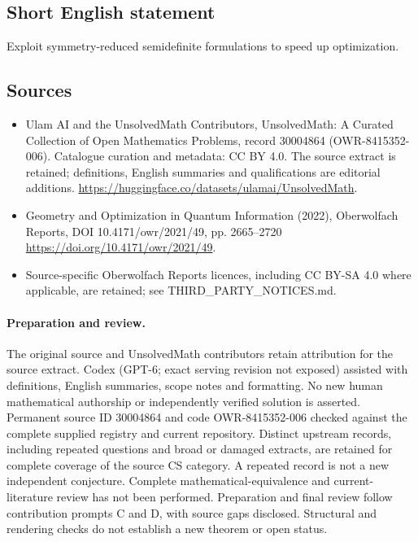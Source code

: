 \documentclass[11pt]{article}
\begin{document}
\subsection{Short English statement}
Exploit symmetry-reduced semidefinite formulations to speed up optimization.
\subsection{Sources}
\begin{itemize}
\item[\hypertarget{source:30004864:1}{S1}] Ulam AI and the UnsolvedMath Contributors, UnsolvedMath: A Curated Collection of Open Mathematics Problems, record 30004864 (OWR-8415352-006). Catalogue curation and metadata: CC BY 4.0. The source extract is retained; definitions, English summaries and qualifications are editorial additions.
\url{https://huggingface.co/datasets/ulamai/UnsolvedMath}.
\item[\hypertarget{source:30004864:2}{S2}] Geometry and Optimization in Quantum Information (2022), Oberwolfach Reports, DOI 10.4171/owr/2021/49, pp. 2665--2720
\url{https://doi.org/10.4171/owr/2021/49}.
\item Source-specific Oberwolfach Reports licences, including CC BY-SA 4.0 where applicable, are retained; see THIRD\_PARTY\_NOTICES.md.
\end{itemize}
\paragraph{Preparation and review.}
The original source and UnsolvedMath contributors retain attribution for the source extract. Codex (GPT-6; exact serving revision not exposed) assisted with definitions, English summaries, scope notes and formatting. No new human mathematical authorship or independently verified solution is asserted. Permanent source ID 30004864 and code OWR-8415352-006 checked against the complete supplied registry and current repository. Distinct upstream records, including repeated questions and broad or damaged extracts, are retained for complete coverage of the source CS category. A repeated record is not a new independent conjecture. Complete mathematical-equivalence and current-literature review has not been performed. Preparation and final review follow contribution prompts C and D, with source gaps disclosed. Structural and rendering checks do not establish a new theorem or open status.
\label{end:30004864}
\end{document}
